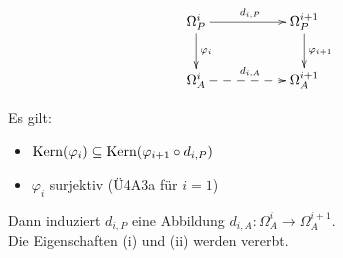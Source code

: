 \documentclass[a4paper, 10pt]{report}
\begin{document}
\begin{SatzDef}
\begin{Bew}
\[
\begin{xy}
\xymatrix{
\Omega_P^i\ar[rr]^{d_{i,P}}\ar[d]^{\varphi_i}&&\Omega_P^{i+1}\ar[d]^{\varphi_{i+1}}\\
\Omega_A^i\ar@{-->}[rr]^{d_{i,A}}&&\Omega_A^{i+1}\\
}
\end{xy}
\]

Es gilt: 
\begin{itemize}
\item $\mathrm{Kern}(\varphi_i)\subseteq \mathrm{Kern}(\varphi_{i+1}\circ d_{i,P})$
\item $\varphi_i$ surjektiv (\"U4A3a f\"ur $i=1$)
\end{itemize}

Dann induziert $d_{i,P}$ eine Abbildung $d_{i,A}: \Omega_A^{i}\to \Omega_A^{i+1}$.\\
Die Eigenschaften (i) und (ii) werden \glqq vererbt\grqq.

\end{Bew}
\end{SatzDef}
\end{document}
